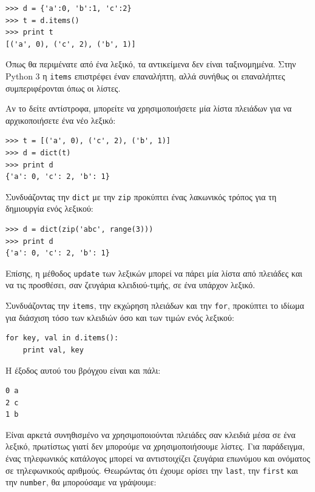\documentclass[10pt]{book}
\begin{document}
\begin{verbatim}
>>> d = {'a':0, 'b':1, 'c':2}
>>> t = d.items()
>>> print t
[('a', 0), ('c', 2), ('b', 1)]
\end{verbatim}
%
Όπως θα περιμένατε από ένα λεξικό, τα αντικείμενα δεν είναι ταξινομημένα. Στην Python 3 η {\tt items} επιστρέφει έναν επαναλήπτη, αλλά συνήθως οι επαναλήπτες συμπεριφέρονται όπως οι λίστες.

Αν το δείτε αντίστροφα, μπορείτε να χρησιμοποιήσετε μία λίστα πλειάδων για να αρχικοποιήσετε ένα νέο λεξικό:

\begin{verbatim}
>>> t = [('a', 0), ('c', 2), ('b', 1)]
>>> d = dict(t)
>>> print d
{'a': 0, 'c': 2, 'b': 1}
\end{verbatim}

Συνδυάζοντας την {\tt dict} με την {\tt zip} προκύπτει ένας λακωνικός τρόπος για τη δημιουργία ενός λεξικού:

\begin{verbatim}
>>> d = dict(zip('abc', range(3)))
>>> print d
{'a': 0, 'c': 2, 'b': 1}
\end{verbatim}
%
Επίσης, η μέθοδος {\tt update} των λεξικών μπορεί να πάρει μία λίστα από πλειάδες και να τις προσθέσει, σαν ζευγάρια κλειδιού-τιμής, σε ένα υπάρχον λεξικό.

Συνδυάζοντας την {\tt items}, την εκχώρηση πλειάδων και την {\tt for}, προκύπτει το ιδίωμα για διάσχιση τόσο των κλειδιών όσο και των τιμών ενός λεξικού:

\begin{verbatim}
for key, val in d.items():
    print val, key
\end{verbatim}
%
Η έξοδος αυτού του βρόγχου είναι και πάλι:

\begin{verbatim}
0 a
2 c
1 b
\end{verbatim}
%

Είναι αρκετά συνηθισμένο να χρησιμοποιούνται πλειάδες σαν κλειδιά μέσα σε ένα λεξικό, πρωτίστως γιατί δεν μπορούμε να χρησιμοποιήσουμε λίστες. Για παράδειγμα, ένας τηλεφωνικός κατάλογος μπορεί να αντιστοιχίζει ζευγάρια επωνύμου και ονόματος σε τηλεφωνικούς αριθμούς. Θεωρώντας ότι έχουμε ορίσει την  {\tt last}, την {\tt first} και την {\tt number}, θα μπορούσαμε να γράψουμε:
\end{document}
